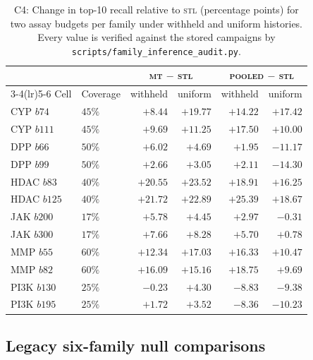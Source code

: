 \documentclass[10pt]{article}
\newcommand{\stl}{\textsc{stl}}
\newcommand{\mt}{\textsc{mt}}
\newcommand{\pooled}{\textsc{pooled}}
\begin{document}
\begin{table}[htbp]
\caption{C4: Change in top-10 recall relative to \stl{} (percentage points)
for two assay budgets per family under withheld and uniform histories.
Every value is verified against the stored campaigns by
\texttt{scripts/family\_inference\_audit.py}.}
\label{tab:design-cells}
\centering\small
\begin{tabular}{llrrrr}
\toprule
 & & \multicolumn{2}{c}{\mt{} $-$ \stl{}} & \multicolumn{2}{c}{\pooled{} $-$ \stl{}} \\
\cmidrule(lr){3-4}\cmidrule(lr){5-6}
Cell & Coverage & withheld & uniform & withheld & uniform \\
\midrule
CYP $b74$   & $45\%$ & $+8.44$  & $+19.77$ & $+14.22$ & $+17.42$ \\
CYP $b111$  & $45\%$ & $+9.69$  & $+11.25$ & $+17.50$ & $+10.00$ \\
DPP $b66$   & $50\%$ & $+6.02$  & $+4.69$  & $+1.95$  & $-11.17$ \\
DPP $b99$   & $50\%$ & $+2.66$  & $+3.05$  & $+2.11$  & $-14.30$ \\
HDAC $b83$  & $40\%$ & $+20.55$ & $+23.52$ & $+18.91$ & $+16.25$ \\
HDAC $b125$ & $40\%$ & $+21.72$ & $+22.89$ & $+25.39$ & $+18.67$ \\
JAK $b200$  & $17\%$ & $+5.78$  & $+4.45$  & $+2.97$  & $-0.31$ \\
JAK $b300$  & $17\%$ & $+7.66$  & $+8.28$  & $+5.70$  & $+0.78$ \\
MMP $b55$   & $60\%$ & $+12.34$ & $+17.03$ & $+16.33$ & $+10.47$ \\
MMP $b82$   & $60\%$ & $+16.09$ & $+15.16$ & $+18.75$ & $+9.69$ \\
PI3K $b130$ & $25\%$ & $-0.23$  & $+4.30$  & $-8.83$  & $-9.38$ \\
PI3K $b195$ & $25\%$ & $+1.72$  & $+3.52$  & $-8.36$  & $-10.23$ \\
\bottomrule
\end{tabular}
\end{table}

\subsection{Legacy six-family null comparisons}
\label{app:permutation}
\end{document}
